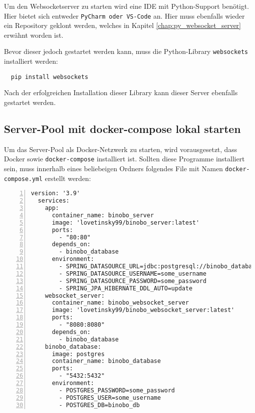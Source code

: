 \documentclass[paper=a4,12pt]{scrreprt}
\begin{document}
Um den Websocketserver zu starten wird eine IDE mit Python-Support benötigt. Hier bietet sich entweder \texttt{PyCharm oder VS-Code} an. Hier muss ebenfalls wieder ein Repository geklont werden, welches in Kapitel \ref{chap:py_websocket_server} erwähnt worden ist.\newline

Bevor dieser jedoch gestartet werden kann, muss die Python-Library \texttt{websockets} installiert werden:\newline

\begin{lstlisting}
  pip install websockets
\end{lstlisting}

Nach der erfolgreichen Installation dieser Library kann dieser Server ebenfalls gestartet werden.\newline

\subsection{Server-Pool mit docker-compose lokal starten}

Um das Server-Pool als Docker-Netzwerk zu starten, wird vorausgesetzt, dass Docker sowie \texttt{docker-compose} installiert ist.\newline
Sollten diese Programme installiert sein, muss innerhalb eines beliebeigen Ordners folgendes File mit Namen \texttt{docker-compose.yml} erstellt werden:\newline

\begin{lstlisting}[caption={docker-compose.yml - Server-Pool als Docker-Netzwerk}, captionpos=b, label={listing:server_pool_docker_net}, numbers=left, stepnumber=1]
  version: '3.9'
  services:
    app:
      container_name: binobo_server
      image: 'lovetinsky99/binobo_server:latest'
      ports:
        - "80:80"
      depends_on:
        - binobo_database
      environment:
        - SPRING_DATASOURCE_URL=jdbc:postgresql://binobo_database:5432/binobo_db
        - SPRING_DATASOURCE_USERNAME=some_username
        - SPRING_DATASOURCE_PASSWORD=some_password
        - SPRING_JPA_HIBERNATE_DDL_AUTO=update
    websocket_server:
      container_name: binobo_websocket_server
      image: 'lovetinsky99/binobo_websocket_server:latest'
      ports:
        - "8080:8080"
      depends_on:
        - binobo_database
    binobo_database:
      image: postgres
      container_name: binobo_database
      ports:
        - "5432:5432"
      environment:
        - POSTGRES_PASSWORD=some_password
        - POSTGRES_USER=some_username
        - POSTGRES_DB=binobo_db
\end{lstlisting}
\end{document}
